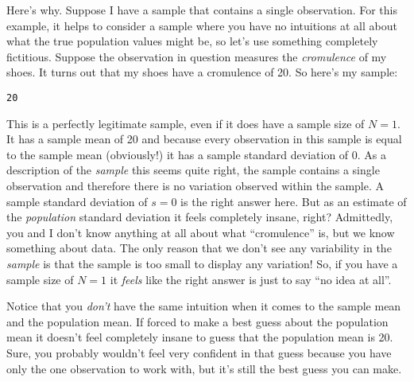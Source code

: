 Here's why. Suppose I have a sample that contains a single observation. For this example, it helps to consider a sample where you have no intuitions at all about what the true population values might be, so let's use something completely fictitious. Suppose the observation in question measures the {\it cromulence} of my shoes. It turns out that my shoes have a cromulence of 20. So here's my sample:
\begin{center}
\texttt{20}
\end{center}
This is a perfectly legitimate sample, even if it does have a sample size of $N=1$. It has a sample mean of 20 and because every observation in this sample is equal to the sample mean (obviously!) it has a sample standard deviation of 0. As a description of the {\it sample} this seems quite right, the sample contains a single observation and therefore there is no variation observed within the sample. A sample standard deviation of $s = 0$ is the right answer here. But as an estimate of the {\it population} standard deviation it feels completely insane, right? Admittedly, you and I don't know anything at all about what ``cromulence'' is, but we know something about data. The only reason that we don't see any variability in the {\it sample} is that the sample is too small to display any variation! So, if you have a sample size of $N=1$ it {\it feels} like the right answer is just to say ``no idea at all''. 

Notice that you {\it don't} have the same intuition when it comes to the sample mean and the population mean. If forced to make a best guess about the population mean it doesn't feel completely insane to guess that the population mean is 20. Sure, you probably wouldn't feel very confident in that guess because you have only the one observation to work with, but it's still the best guess you can make. 

